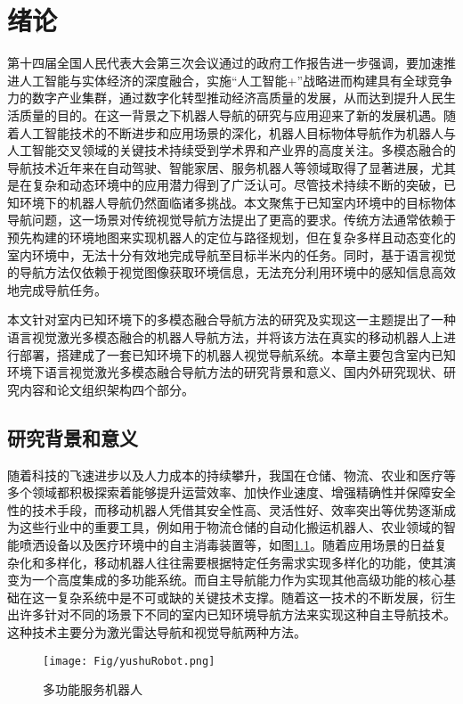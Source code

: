 \chapter{绪论}
%
	第十四届全国人民代表大会第三次会议通过的政府工作报告进一步强调，要加速推进人工智能与实体经济的深度融合，实施“人工智能+”战略进而构建具有全球竞争力的数字产业集群，通过数字化转型推动经济高质量的发展，从而达到提升人民生活质量\cite{China2025}的目的。在这一背景之下机器人导航的研究与应用迎来了新的发展机遇。随着人工智能技术的不断进步和应用场景的深化，机器人目标物体导航\cite{zhang2022survey}作为机器人与人工智能交叉领域的关键技术持续受到学术界和产业界的高度关注。多模态融合的导航技术近年来在自动驾驶、智能家居、服务机器人等领域取得了显著进展\cite{majumdar2022zson}，尤其是在复杂和动态环境中的应用潜力得到了广泛认可。尽管技术持续不断的突破，已知环境下的机器人导航仍然面临诸多挑战。本文聚焦于已知室内环境中的目标物体导航问题\cite{sun2024survey}，这一场景对传统视觉导航方法提出了更高的要求。传统方法通常依赖于预先构建的环境地图来实现机器人的定位与路径规划，但在复杂多样且动态变化的室内环境中，无法十分有效地完成导航至目标半米内的任务\cite{mavrogiannis2023core}。同时，基于语言视觉的导航方法仅依赖于视觉图像获取环境信息，无法充分利用环境中的感知信息高效地完成导航任务\cite{li2023reinforcement}。

	本文针对室内已知环境下的多模态融合导航方法的研究及实现这一主题提出了一种语言视觉激光多模态融合的机器人导航方法，并将该方法在真实的移动机器人上进行部署，搭建成了一套已知环境下的机器人视觉导航系统。本章主要包含室内已知环境下语言视觉激光多模态融合导航方法的研究背景和意义、国内外研究现状、研究内容和论文组织架构四个部分。

\section{研究背景和意义}
	随着科技的飞速进步以及人力成本的持续攀升，我国在仓储、物流、农业和医疗等多个领域都积极探索着能够提升运营效率、加快作业速度、增强精确性并保障安全性的技术手段，而移动机器人凭借其安全性高、灵活性好、效率突出等优势逐渐成为这些行业中的重要工具\cite{reddy2023advancements}，例如用于物流仓储的自动化搬运机器人、农业领域的智能喷洒设备以及医疗环境中的自主消毒装置等，如图\ref{serverrobot}。随着应用场景的日益复杂化和多样化，移动机器人往往需要根据特定任务需求实现多样化的功能，使其演变为一个高度集成的多功能系统。而自主导航能力作为实现其他高级功能的核心基础在这一复杂系统中是不可或缺的关键技术支撑。随着这一技术的不断发展，衍生出许多针对不同的场景下不同的室内已知环境导航方法来实现这种自主导航技术。这种技术主要分为激光雷达导航\cite{zhang2014loam}和视觉导航\cite{kazerouni2022survey}两种方法。
	\begin{figure}[htbp]
		\centering
		\texttt{[image: Fig/yushuRobot.png]}
		\caption{\label{serverrobot}多功能服务机器人}
	\end{figure}


